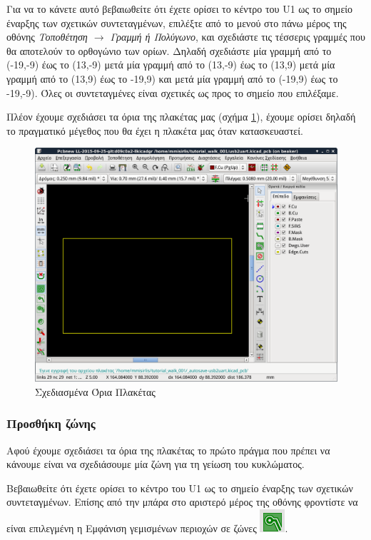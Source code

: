 \documentclass[a4paper]{article}
\begin{document}
Για να το κάνετε αυτό βεβαιωθείτε ότι έχετε ορίσει το κέντρο του U1  ως το σημείο έναρξης των σχετικών συντεταγμένων, επιλέξτε από το μενού στο πάνω μέρος της οθόνης \textit{Τοποθέτηση $\rightarrow$ Γραμμή ή Πολύγωνο}, και σχεδιάστε τις τέσσερις γραμμές που θα αποτελούν το ορθογώνιο των ορίων. Δηλαδή σχεδιάστε μία γραμμή από το (-19,-9) έως το (13,-9) μετά μία γραμμή από το (13,-9) έως το (13,9) μετά μία γραμμή από το (13,9) έως το -19,9) και μετά μία γραμμή από το (-19,9) έως το -19,-9). Όλες οι συντεταγμένες είναι σχετικές ως προς το σημείο που επιλέξαμε.

Πλέον έχουμε σχεδιάσει τα όρια της πλακέτας μας (σχήμα \ref{fig:pcb-main-edges}), έχουμε ορίσει δηλαδή το πραγματικό μέγεθος που θα έχει η πλακέτα μας όταν κατασκευαστεί.

\begin{figure}
  \begin{center}
    \includegraphics[width=.9\textwidth]{img/pcb-main-edges.png}
    \caption{Σχεδιασμένα Όρια Πλακέτας}
    \label{fig:pcb-main-edges}
  \end{center}
\end{figure}


\subsubsection{Προσθήκη ζώνης}
Αφού έχουμε σχεδιάσει τα όρια της πλακέτας το πρώτο πράγμα που πρέπει να κάνουμε είναι να σχεδιάσουμε μία ζώνη για τη γείωση του κυκλώματος. 

Βεβαιωθείτε ότι έχετε ορίσει το κέντρο του U1  ως το σημείο έναρξης των σχετικών συντεταγμένων. Επίσης από την μπάρα στο αριστερό μέρος της οθόνης φροντίστε να είναι επιλεγμένη η Εμφάνιση γεμισμένων περιοχών σε ζώνες \includegraphics[scale=.5]{img/pcb-ico-fullzones.png}.
\end{document}
